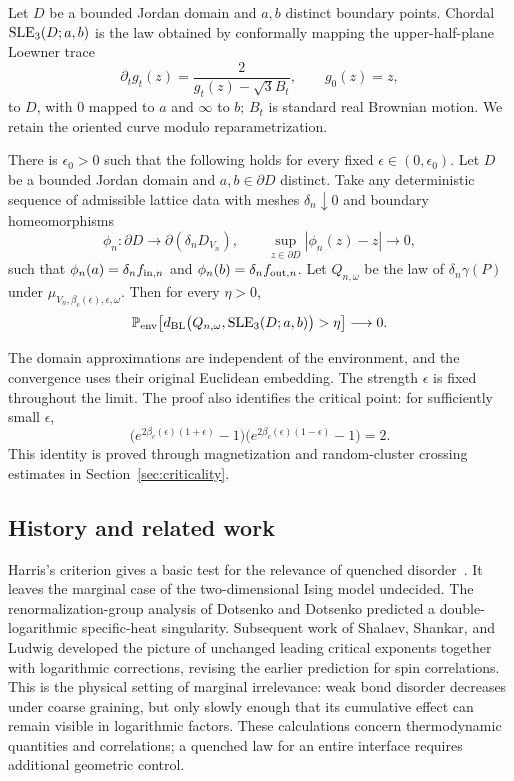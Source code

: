 Let $D$ be a bounded Jordan domain and $a,b$ distinct boundary points.
Chordal $\operatorname{SLE}_3(D;a,b)$ is the law obtained by conformally mapping the
upper-half-plane Loewner trace
\[
 \partial_t g_t(z)=\frac2{g_t(z)-\sqrt3 B_t},\qquad g_0(z)=z,
\]
to $D$, with $0$ mapped to $a$ and $\infty$ to $b$; $B_t$ is standard
real Brownian motion. We retain the oriented curve modulo
reparametrization.

\begin{theorem}\label{thm:main}
There is $\epsilon_0>0$ such that the following holds for every fixed
$\epsilon\in(0,\epsilon_0)$. Let $D$ be a bounded Jordan domain and
$a,b\in\partial D$ distinct. Take any deterministic sequence of admissible
lattice data with meshes $\delta_n\downarrow0$ and boundary
homeomorphisms
\[
 \phi_n:\partial D\longrightarrow\partial(\delta_n D_{V_n}),
 \qquad \sup_{z\in\partial D}|\phi_n(z)-z|\longrightarrow0,
\]
such that $\phi_n(a)=\delta_n f_{{\rm in},n}$ and
$\phi_n(b)=\delta_n f_{{\rm out},n}$. Let $Q_{n,\omega}$ be the law
of $\delta_n\gamma(P)$ under
$\mu_{V_n,\beta_c(\epsilon),\epsilon,\omega}$. Then for every $\eta>0$,
\begin{equation}\label{intro:main-convergence}
 \mathbb P_{\rm env}\!\left[
 d_{\rm BL}\bigl(Q_{n,\omega},\operatorname{SLE}_3(D;a,b)\bigr)>\eta\right]
                   \longrightarrow0.
\end{equation}
\end{theorem}

The domain approximations are independent of the environment, and the
convergence uses their original Euclidean embedding. The strength
$\epsilon$ is fixed throughout the limit. The proof also identifies
the critical point: for sufficiently small $\epsilon$,
\begin{equation}\label{intro:selfdual-beta}
 \bigl(e^{2\beta_c(\epsilon)(1+\epsilon)}-1\bigr)
 \bigl(e^{2\beta_c(\epsilon)(1-\epsilon)}-1\bigr)=2.
\end{equation}
This identity is proved through magnetization and random-cluster
crossing estimates in Section~\ref{sec:criticality}.

\subsection{History and related work}

Harris's criterion gives a basic test for the relevance of quenched
disorder~\cite{Harris}. It leaves the
marginal case of the two-dimensional Ising model undecided. The
renormalization-group analysis of Dotsenko and Dotsenko
\cite{DD,DDReview} predicted a double-logarithmic specific-heat
singularity. Subsequent work of Shalaev, Shankar, and Ludwig
\cite{Shalaev,Shankar,Ludwig} developed the picture of unchanged leading
critical exponents together with logarithmic corrections, revising the
earlier prediction for spin correlations. This is the physical setting
of marginal irrelevance: weak bond disorder decreases under coarse graining, but
only slowly enough that its cumulative effect can remain visible in
logarithmic factors. These calculations concern thermodynamic quantities
and correlations; a quenched law for an entire interface requires
additional geometric control.

